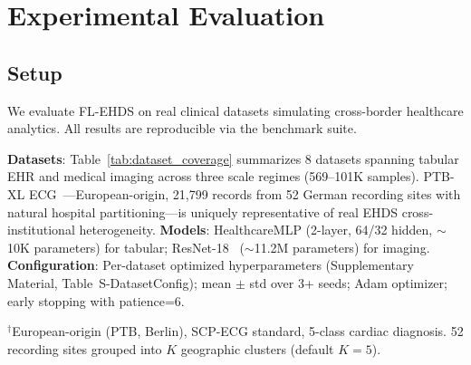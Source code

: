 \documentclass[conference]{IEEEtran}
\begin{document}
\section{Experimental Evaluation}
\label{sec:experiments}

\subsection{Setup}

We evaluate FL-EHDS on real clinical datasets simulating cross-border healthcare analytics. All results are reproducible via the benchmark suite.

\textbf{Datasets}: Table~\ref{tab:dataset_coverage} summarizes 8 datasets spanning tabular EHR and medical imaging across three scale regimes (569--101K samples). PTB-XL ECG~\cite{wagner2020ptbxl}---European-origin, 21,799 records from 52 German recording sites with natural hospital partitioning---is uniquely representative of real EHDS cross-institutional heterogeneity. \textbf{Models}: HealthcareMLP (2-layer, 64/32 hidden, $\sim$10K parameters) for tabular; ResNet-18~\cite{he2016deep} ($\sim$11.2M parameters) for imaging. \textbf{Configuration}: Per-dataset optimized hyperparameters (Supplementary Material, Table~S-DatasetConfig); mean $\pm$ std over 3+ seeds; Adam optimizer; early stopping with patience=6.

\begin{table}[htbp]
\centering
\caption{Evaluated Dataset Coverage}
\label{tab:dataset_coverage}

\vspace{1mm}
\footnotesize{$^\dagger$European-origin (PTB, Berlin), SCP-ECG standard, 5-class cardiac diagnosis. 52 recording sites grouped into $K$ geographic clusters (default $K{=}5$).}
\end{table}
\end{document}
